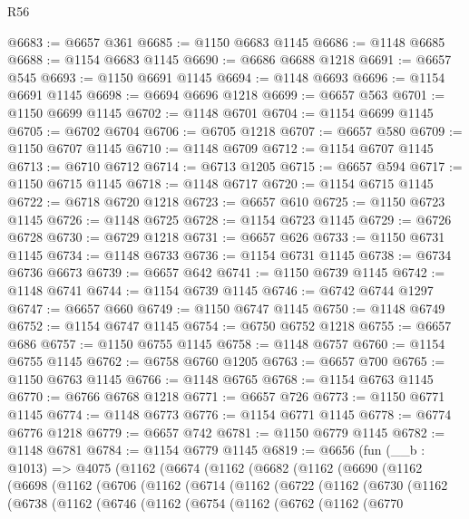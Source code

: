 \begin{lexlean}{R56}
\begin{coremodule}
@6683 := @6657 @361
@6685 := @1150 @6683 @1145
@6686 := @1148 @6685
@6688 := @1154 @6683 @1145
@6690 := @6686 @6688 @1218
@6691 := @6657 @545
@6693 := @1150 @6691 @1145
@6694 := @1148 @6693
@6696 := @1154 @6691 @1145
@6698 := @6694 @6696 @1218
@6699 := @6657 @563
@6701 := @1150 @6699 @1145
@6702 := @1148 @6701
@6704 := @1154 @6699 @1145
@6705 := @6702 @6704
@6706 := @6705 @1218
@6707 := @6657 @580
@6709 := @1150 @6707 @1145
@6710 := @1148 @6709
@6712 := @1154 @6707 @1145
@6713 := @6710 @6712
@6714 := @6713 @1205
@6715 := @6657 @594
@6717 := @1150 @6715 @1145
@6718 := @1148 @6717
@6720 := @1154 @6715 @1145
@6722 := @6718 @6720 @1218
@6723 := @6657 @610
@6725 := @1150 @6723 @1145
@6726 := @1148 @6725
@6728 := @1154 @6723 @1145
@6729 := @6726 @6728
@6730 := @6729 @1218
@6731 := @6657 @626
@6733 := @1150 @6731 @1145
@6734 := @1148 @6733
@6736 := @1154 @6731 @1145
@6738 := @6734 @6736 @6673
@6739 := @6657 @642
@6741 := @1150 @6739 @1145
@6742 := @1148 @6741
@6744 := @1154 @6739 @1145
@6746 := @6742 @6744 @1297
@6747 := @6657 @660
@6749 := @1150 @6747 @1145
@6750 := @1148 @6749
@6752 := @1154 @6747 @1145
@6754 := @6750 @6752 @1218
@6755 := @6657 @686
@6757 := @1150 @6755 @1145
@6758 := @1148 @6757
@6760 := @1154 @6755 @1145
@6762 := @6758 @6760 @1205
@6763 := @6657 @700
@6765 := @1150 @6763 @1145
@6766 := @1148 @6765
@6768 := @1154 @6763 @1145
@6770 := @6766 @6768 @1218
@6771 := @6657 @726
@6773 := @1150 @6771 @1145
@6774 := @1148 @6773
@6776 := @1154 @6771 @1145
@6778 := @6774 @6776 @1218
@6779 := @6657 @742
@6781 := @1150 @6779 @1145
@6782 := @1148 @6781
@6784 := @1154 @6779 @1145
@6819 := @6656
    (fun (__b : @1013) =>
    @4075
      (@1162
        (@6674
          (@1162
            (@6682
              (@1162
                (@6690
                  (@1162
                    (@6698
                      (@1162
                        (@6706
                          (@1162
                            (@6714
                              (@1162
                                (@6722
                                  (@1162
                                    (@6730
                                      (@1162
                                        (@6738
                                          (@1162
                                            (@6746
                                              (@1162
                                                (@6754
                                                  (@1162
                                                    (@6762
                                                      (@1162
                                                        (@6770

\end{coremodule}
\end{lexlean}
